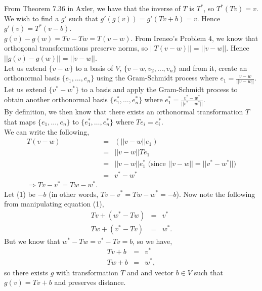 \documentclass[12pt]{article}
\begin{document}
\noindent
From Theorem 7.36 in Axler, we have that the inverse of $T$ is $T^*$, so $T^*(Tv) = v$. We wish to find a $g'$ such that $g'(g(v)) = g'(Tv + b) = v$. Hence $g'(v) = \boxed{T^*(v - b)}$. \\

\noindent
$g(v) - g(w) = Tv - Tw = T(v -w)$. From Ireneo's Problem 4, we know that orthogonal transformations preserve norms, so $||T(v - w)|| = ||v-w||$. Hence $||g(v) - g(w)|| = ||v-w||$.\\

\noindent
Let us extend $\{v - w\}$ to a basis of $V$, $\{v-w, v_2, \ldots, v_n\}$ and from it, create an orthonormal basis $\{e_1, \ldots, e_n\}$ using the Gram-Schmidt process where $e_1 = \frac{v-w}{||v-w||}$.\\

\noindent
 Let us extend $\{v^* - w^*\}$ to a basis and apply the Gram-Schmidt process to obtain another orthonormal basis $\{e_1^*, \ldots, e_n^*\}$ where $e_1^* = \frac{v^* - w^*}{||v^* - w^*||}$.\\ 
 
 \noindent
 By definition, we then know that there exists an orthonormal transformation $T$ that maps  $\{e_1, \ldots, e_n\}$ to $\{e_1^*, \ldots, e_n^*\}$ where $Te_i = e_i^*$.\\
 
 \noindent
  We can write the following,
  \begin{eqnarray}
  T(v-w) &=& (||v-w||e_1) \nonumber \\
  &=& ||v-w||Te_1 \nonumber \\
  &=& ||v-w||e_1^* \text{ (since } ||v-w|| = ||v^*-w^*||) \nonumber \\
  &=& v^* - w^* \nonumber \\
  \Longrightarrow Tv - v^* = Tw - w^*.
  \end{eqnarray}
  Let (1) be $-b$ (in other words, $Tv - v^* = Tw - w^* = -b$). Now note the following from manipulating equation (1),
  \begin{eqnarray*}
  Tv + (w^* - Tw) &=& v^*\\
  Tw + (v^* - Tv) &=& w^*.
  \end{eqnarray*}
  But we know that $w^* - Tw = v^* - Tv = b$, so we have,
  \begin{eqnarray*}
  Tv + b &=& v^*\\
  Tw + b &=& w^*,
  \end{eqnarray*}
  so there exists $g$ with transformation $T$ and and vector $b \in V$ such that $g(v) = Tv + b$ and preserves distance. 
\end{document}
